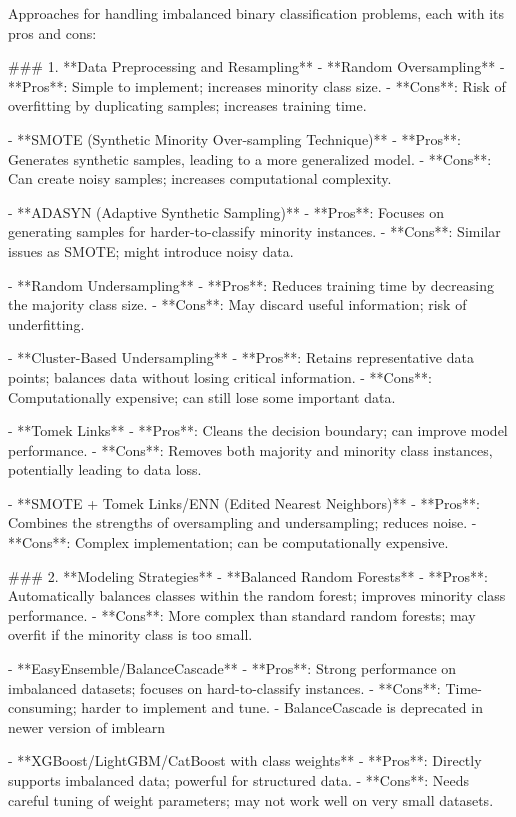 Approaches for handling imbalanced binary classification problems, each with its pros and cons:

### 1. **Data Preprocessing and Resampling**
   - **Random Oversampling**
     - **Pros**: Simple to implement; increases minority class size.
     - **Cons**: Risk of overfitting by duplicating samples; increases training time.

   - **SMOTE (Synthetic Minority Over-sampling Technique)**
     - **Pros**: Generates synthetic samples, leading to a more generalized model.
     - **Cons**: Can create noisy samples; increases computational complexity.

   - **ADASYN (Adaptive Synthetic Sampling)**
     - **Pros**: Focuses on generating samples for harder-to-classify minority instances.
     - **Cons**: Similar issues as SMOTE; might introduce noisy data.

   - **Random Undersampling**
     - **Pros**: Reduces training time by decreasing the majority class size.
     - **Cons**: May discard useful information; risk of underfitting.

   - **Cluster-Based Undersampling**
     - **Pros**: Retains representative data points; balances data without losing critical information.
     - **Cons**: Computationally expensive; can still lose some important data.

   - **Tomek Links**
     - **Pros**: Cleans the decision boundary; can improve model performance.
     - **Cons**: Removes both majority and minority class instances, potentially leading to data loss.

   - **SMOTE + Tomek Links/ENN (Edited Nearest Neighbors)**
     - **Pros**: Combines the strengths of oversampling and undersampling; reduces noise.
     - **Cons**: Complex implementation; can be computationally expensive.

### 2. **Modeling Strategies**
   - **Balanced Random Forests**
     - **Pros**: Automatically balances classes within the random forest; improves minority class performance.
     - **Cons**: More complex than standard random forests; may overfit if the minority class is too small.

   - **EasyEnsemble/BalanceCascade**
     - **Pros**: Strong performance on imbalanced datasets; focuses on hard-to-classify instances.
     - **Cons**: Time-consuming; harder to implement and tune.
     - BalanceCascade is deprecated in newer version of imblearn

   - **XGBoost/LightGBM/CatBoost with class weights**
     - **Pros**: Directly supports imbalanced data; powerful for structured data.
     - **Cons**: Needs careful tuning of weight parameters; may not work well on very small datasets.

